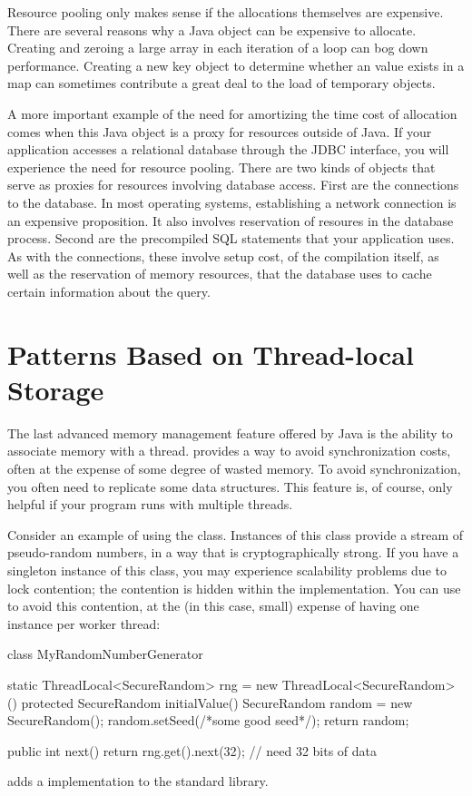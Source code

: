 Resource pooling only makes sense if the allocations themselves are expensive.
There are several reasons why a Java object can be expensive to allocate.
Creating and zeroing a large array in each iteration of a
loop can bog down performance. Creating a new key object to determine whether an
value exists in a map can sometimes contribute a great deal to the load of
temporary objects.

A more important example of the need for amortizing the time cost of allocation
comes when this Java object is a proxy for resources outside of Java. If your
application accesses a relational database through the JDBC
interface, you will experience the need for resource pooling. There are two kinds
of objects that serve as proxies for resources involving database access. First
are the connections to the database. In most operating systems, establishing a
network connection is an expensive proposition. It also involves reservation of
resoures in the database process. Second are the precompiled SQL statements that
your application uses. As with the connections, these involve setup cost, of the
compilation itself, as well as the reservation of memory resources, that the
database uses to cache certain information about the query.

\section{Patterns Based on Thread-local Storage}

The last advanced memory management feature offered by Java is the ability to
associate memory with a thread. \Tls provides a way to avoid
synchronization costs, often at the expense of some degree of wasted memory. To
avoid synchronization, you often need to replicate some data structures. This
feature is, of course, only helpful if your program runs with multiple threads.

Consider an example of using the  class. Instances of this
class provide a stream of pseudo-random numbers, in a way that is
cryptographically strong. If you have a singleton instance of this class, you may
experience scalability problems due to lock contention; the contention is hidden
within the  implementation. You can use \tls
to avoid this contention, at the (in this case, small) expense of having one
instance per worker thread:
\begin{shortlisting}
class MyRandomNumberGenerator {
   static ThreadLocal<SecureRandom> rng = new ThreadLocal<SecureRandom>() {
      protected SecureRandom initialValue() {
         SecureRandom random = new SecureRandom();
         random.setSeed(/*some good seed*/);
         return random;
      }
   }
   
   public int next() {
      return rng.get().next(32); // need 32 bits of data
   }
}
\end{shortlisting} 
\javaseven adds a  implementation to the standard
library.

